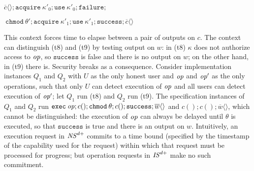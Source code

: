 \documentclass[10pt]{article}
\newcommand{\op}{{\it op}}
\newcommand{\tup}[1]{\langle #1\rangle}
\begin{document}
\begin{description}
\item $\overline c\tup{}; \mathtt{acquire}\:\kappa'_0; \mathtt{use}\:\kappa'_0; \mathtt{failure};$

$\:\mathtt{chmod}\:\theta'; \mathtt{acquire}\:\kappa'_1; \mathtt{use}\:\kappa'_1; \mathtt{success}; \overline c\tup{}$
\end{description}
This context forces time to elapse between a pair of outputs on $c$. The context can distinguish (t8) and (t9) by testing output on $w$: in (t8) $\kappa$ does not authorize access to $\op$, so $\mathtt{success}$ is false and there is no output on $w$; on the other hand, in (t9) there is. Security breaks as a consequence. Consider implementation instances $Q_1$ and $Q_2$ with $U$ as the only honest user and $\op$ and $\op'$ as the only operations, such that only $U$ can detect execution of $\op$ and all users can detect execution of $\op'$; let $Q_1$ run (t8) and $Q_2$ run (t9). The specification instances of $Q_1$ and $Q_2$ run $\mathtt{exec}\:\op; c(); \mathtt{chmod}\:\theta; c(); \mathtt{success}; \overline w\tup{}$ and $c(); c(); \overline w\tup{}$, which cannot be distinguished: the execution of $\op$ can always be delayed until $\theta$ is executed, so that $\mathtt{success}$ is true and there is an output on $w$. Intuitively, an execution request in ${\it NS}^{d+}$ commits to a time bound (specified by the timestamp of the capability used for the request) within which that request must be processed for progress; but operation requests in ${\it IS}^{d+}$ make no such commitment. 
\end{document}
